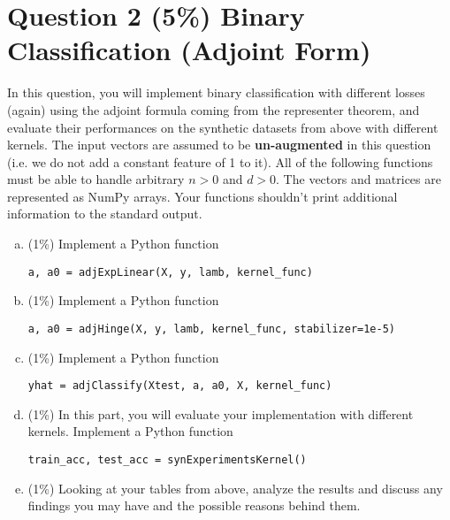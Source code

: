 \documentclass[12pt]{article}
\newcounter{ques}
\begin{document}
\section*{Question 2 (5\%) Binary Classification (Adjoint Form)}
In this question, you will implement binary classification with different losses (again) using the adjoint formula coming from the representer theorem, and evaluate their performances on the synthetic datasets from above with different kernels.
The input vectors are assumed to be \textbf{un-augmented} in this question (i.e. we do not add a constant feature of 1 to it). All of the following functions must be able to handle arbitrary $n > 0$ and $d > 0$. The vectors and matrices are represented as NumPy arrays. Your functions shouldn't print additional information to the
standard output.
\begin{enumerate}[(a)]
  \item (1\%) Implement a Python function
  \begin{center}
    \texttt{a, a0 = adjExpLinear(X, y, lamb, kernel\_func)}
  \end{center}
  \item (1\%) Implement a Python function
  \begin{center}
    \texttt{a, a0 = adjHinge(X, y, lamb, kernel\_func, stabilizer=1e-5)}
  \end{center}
  \item (1\%) Implement a Python function
  \begin{center}
    \texttt{yhat = adjClassify(Xtest, a, a0, X, kernel\_func)}
  \end{center}
  \item (1\%) In this part, you will evaluate your implementation with different kernels. Implement a Python function
  \begin{center}
    \texttt{train\_acc, test\_acc = synExperimentsKernel()}
  \end{center}
  \item (1\%) Looking at your tables from above, analyze the results and discuss any findings you may have and the possible reasons behind them.
\end{enumerate}
\end{document}
